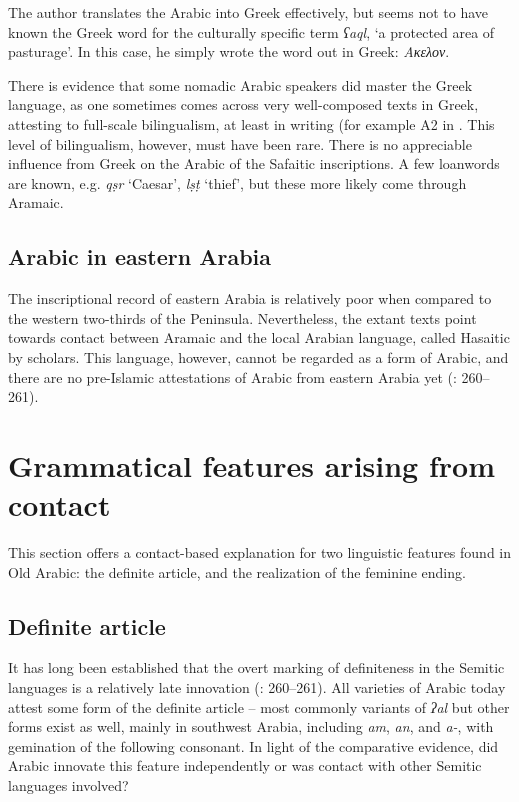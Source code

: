 \documentclass[output=paper]{langsci/langscibook}
\begin{document}
The author translates the Arabic into Greek effectively, but seems not to have known the Greek word for the culturally specific term \textit{ʕaql}, ‘a protected area of pasturage’. In this case, he simply wrote the word out in Greek: \textit{Ακελον}.

There is evidence that some nomadic Arabic speakers did master the Greek language, as one sometimes comes across very well-composed texts in Greek, attesting to full-scale bilingualism, at least in writing (for example A2 in \citet{Al-Jalladal-Manaser2015}. This level of bilingualism, however, must have been rare. There is no appreciable influence from Greek on the Arabic of the Safaitic inscriptions. A few loanwords are known, e.g. \textit{qṣr} ‘Caesar’, \textit{lṣṭ} ‘thief', but these more likely come through Aramaic.

\subsection{Arabic in eastern Arabia}
The inscriptional record of eastern Arabia is relatively poor when compared to the western two-thirds of the Peninsula. Nevertheless, the extant texts point towards contact between Aramaic and the local Arabian language, called Hasaitic by scholars. This language, however, cannot be regarded as a form of Arabic, and there are no pre-Islamic attestations of Arabic from eastern Arabia yet (\citealt{Al-Jallad2018ANA}: 260--261). 

\section{Grammatical features arising from contact}
This section offers a contact-based explanation for two linguistic features found in Old Arabic: the definite article, and the realization of the feminine ending.

\subsection{Definite article}
It has long been established that the overt marking of definiteness in the Semitic languages is a relatively late innovation (\citealt{HuehnergardRubin2011}: 260--261). All varieties of Arabic today attest some form of the definite article -- most commonly variants of \textit{ʔal} but other forms exist as well, mainly in southwest Arabia, including \textit{am}, \textit{an}, and \textit{a-}, with gemination of the following consonant. In light of the comparative evidence, did Arabic innovate this feature independently or was contact with other Semitic languages involved?
\end{document}
